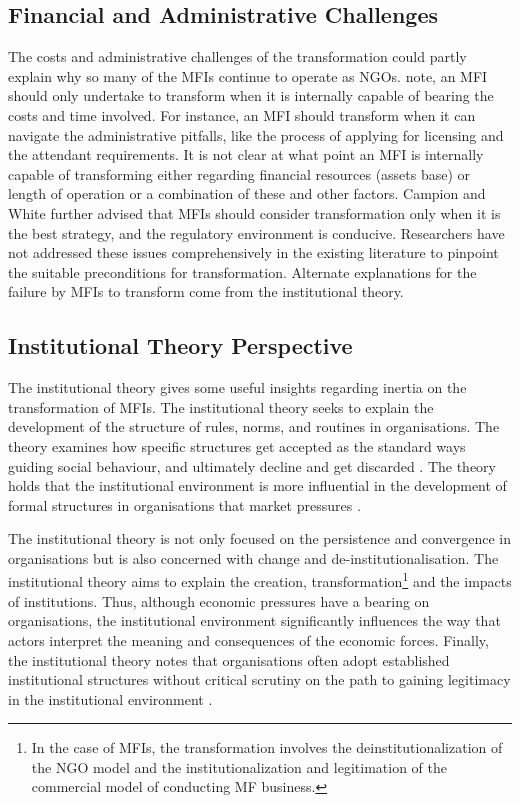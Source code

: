 \documentclass[a4paper, nobind]{templates/ociamthesis}
\begin{document}
\hypertarget{financial-and-administrative-challenges}{%
\subsection{Financial and Administrative Challenges}\label{financial-and-administrative-challenges}}

\noindent The costs and administrative challenges of the transformation could partly explain why so many of the MFIs continue to operate as NGOs. \textcite{campion1999institutional} note, an MFI should only undertake to transform when it is internally capable of bearing the costs and time involved. For instance, an MFI should transform when it can navigate the administrative pitfalls, like the process of applying for licensing and the attendant requirements. It is not clear at what point an MFI is internally capable of transforming either regarding financial resources (assets base) or length of operation or a combination of these and other factors. Campion and White further advised that MFIs should consider transformation only when it is the best strategy, and the regulatory environment is conducive. Researchers have not addressed these issues comprehensively in the existing literature to pinpoint the suitable preconditions for transformation. Alternate explanations for the failure by MFIs to transform come from the institutional theory.

\hypertarget{institutional-theory-perspective}{%
\subsection{Institutional Theory Perspective}\label{institutional-theory-perspective}}

\noindent The institutional theory gives some useful insights regarding inertia on the transformation of MFIs. The institutional theory seeks to explain the development of the structure of rules, norms, and routines in organisations. The theory examines how specific structures get accepted as the standard ways guiding social behaviour, and ultimately decline and get discarded \autocite{scott2005institutional}. The theory holds that the institutional environment is more influential in the development of formal structures in organisations that market pressures \autocite{powell2012new}.

The institutional theory is not only focused on the persistence and convergence in organisations but is also concerned with change and de-institutionalisation. The institutional theory aims to explain the creation, transformation\footnote{In the case of MFIs, the transformation involves the deinstitutionalization of the NGO model and the institutionalization and legitimation of the commercial model of conducting MF business.} and the impacts of institutions\autocite{powell2012new}. Thus, although economic pressures have a bearing on organisations, the institutional environment significantly influences the way that actors interpret the meaning and consequences of the economic forces. Finally, the institutional theory notes that organisations often adopt established institutional structures without critical scrutiny on the path to gaining legitimacy in the institutional environment \autocite{tina2002institutional}.
\end{document}
